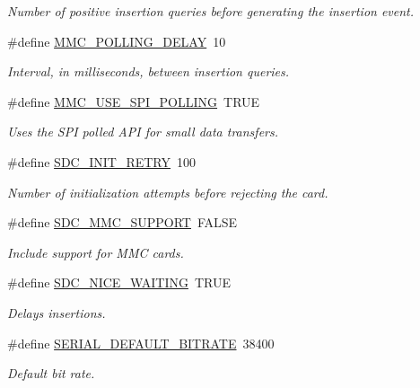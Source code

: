 \begin{DoxyCompactItemize}
\begin{DoxyCompactList}\small\item\em Number of positive insertion queries before generating the insertion event. \end{DoxyCompactList}\item 
\#define \hyperlink{group___h_a_l___c_o_n_f_ga6d164ed93ae233b2dc0c35bd19f75224}{M\+M\+C\+\_\+\+P\+O\+L\+L\+I\+N\+G\+\_\+\+D\+E\+L\+A\+Y}~10
\begin{DoxyCompactList}\small\item\em Interval, in milliseconds, between insertion queries. \end{DoxyCompactList}\item 
\#define \hyperlink{group___h_a_l___c_o_n_f_ga463aaf38dda5f44ab579ddab0a1cf104}{M\+M\+C\+\_\+\+U\+S\+E\+\_\+\+S\+P\+I\+\_\+\+P\+O\+L\+L\+I\+N\+G}~T\+R\+U\+E
\begin{DoxyCompactList}\small\item\em Uses the S\+P\+I polled A\+P\+I for small data transfers. \end{DoxyCompactList}\item 
\#define \hyperlink{group___h_a_l___c_o_n_f_ga8d39f0c9799062f0698d97c26e6fa42d}{S\+D\+C\+\_\+\+I\+N\+I\+T\+\_\+\+R\+E\+T\+R\+Y}~100
\begin{DoxyCompactList}\small\item\em Number of initialization attempts before rejecting the card. \end{DoxyCompactList}\item 
\#define \hyperlink{group___h_a_l___c_o_n_f_ga4f938eff7370feb8de8411e255d21b01}{S\+D\+C\+\_\+\+M\+M\+C\+\_\+\+S\+U\+P\+P\+O\+R\+T}~F\+A\+L\+S\+E
\begin{DoxyCompactList}\small\item\em Include support for M\+M\+C cards. \end{DoxyCompactList}\item 
\#define \hyperlink{group___h_a_l___c_o_n_f_ga3391c832c171a8606b0fc864766f08ba}{S\+D\+C\+\_\+\+N\+I\+C\+E\+\_\+\+W\+A\+I\+T\+I\+N\+G}~T\+R\+U\+E
\begin{DoxyCompactList}\small\item\em Delays insertions. \end{DoxyCompactList}\item 
\#define \hyperlink{group___h_a_l___c_o_n_f_gacb4c08ac23f83ac9d58c50ff840de516}{S\+E\+R\+I\+A\+L\+\_\+\+D\+E\+F\+A\+U\+L\+T\+\_\+\+B\+I\+T\+R\+A\+T\+E}~38400
\begin{DoxyCompactList}\small\item\em Default bit rate. \end{DoxyCompactList}\item 

\end{DoxyCompactItemize}
